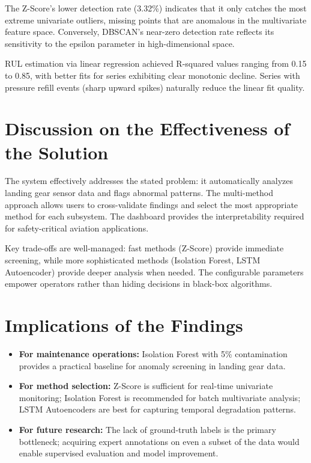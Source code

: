 \documentclass{CLS_zhou430}
\begin{document}
The Z-Score's lower detection rate (3.32\%) indicates that it only catches the most extreme univariate outliers, missing points that are anomalous in the multivariate feature space. Conversely, DBSCAN's near-zero detection rate reflects its sensitivity to the epsilon parameter in high-dimensional space.

RUL estimation via linear regression achieved R-squared values ranging from 0.15 to 0.85, with better fits for series exhibiting clear monotonic decline. Series with pressure refill events (sharp upward spikes) naturally reduce the linear fit quality.

\section{Discussion on the Effectiveness of the Solution}
The system effectively addresses the stated problem: it automatically analyzes landing gear sensor data and flags abnormal patterns. The multi-method approach allows users to cross-validate findings and select the most appropriate method for each subsystem. The dashboard provides the interpretability required for safety-critical aviation applications.

Key trade-offs are well-managed: fast methods (Z-Score) provide immediate screening, while more sophisticated methods (Isolation Forest, LSTM Autoencoder) provide deeper analysis when needed. The configurable parameters empower operators rather than hiding decisions in black-box algorithms.

\section{Implications of the Findings}
\begin{itemize}
    \item \textbf{For maintenance operations:} Isolation Forest with 5\% contamination provides a practical baseline for anomaly screening in landing gear data.
    \item \textbf{For method selection:} Z-Score is sufficient for real-time univariate monitoring; Isolation Forest is recommended for batch multivariate analysis; LSTM Autoencoders are best for capturing temporal degradation patterns.
    \item \textbf{For future research:} The lack of ground-truth labels is the primary bottleneck; acquiring expert annotations on even a subset of the data would enable supervised evaluation and model improvement.
\end{itemize}
\end{document}
